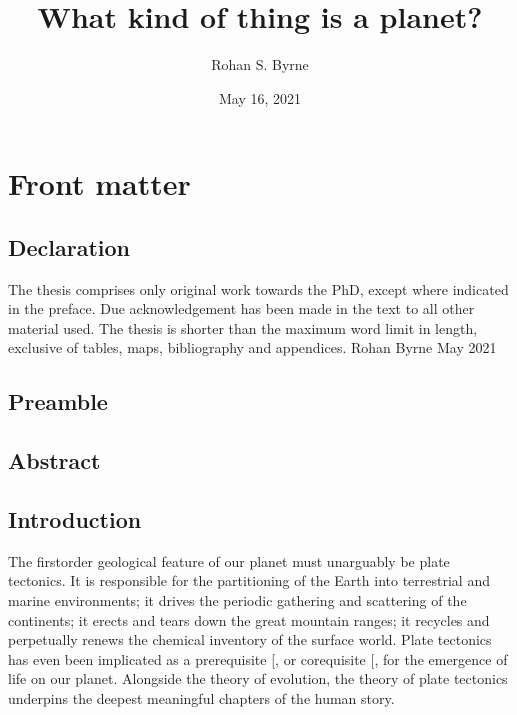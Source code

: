 \documentclass[letterpaper,10pt,english]{jupyterBook}
\title{What kind of thing is a planet?}
\date{May 16, 2021}
\author{Rohan S.\@{} Byrne}
\begin{document}
\pagestyle{empty}
\sphinxmaketitle
\pagestyle{plain}
\sphinxtableofcontents
\pagestyle{normal}
\label{\detokenize{index::doc}}



\part{Front matter}


\chapter{Declaration}
\label{\detokenize{frontmatter/declaration:declaration}}\label{\detokenize{frontmatter/declaration::doc}}
\sphinxAtStartPar
The thesis comprises only original work towards the PhD, except where indicated in the preface. Due acknowledgement has been made in the text to all other material used. The thesis is shorter than the maximum word limit in length, exclusive of tables, maps, bibliography and appendices.
Rohan Byrne
May 2021


\chapter{Preamble}
\label{\detokenize{frontmatter/preamble:preamble}}\label{\detokenize{frontmatter/preamble::doc}}

\chapter{Abstract}
\label{\detokenize{frontmatter/abstract:abstract}}\label{\detokenize{frontmatter/abstract::doc}}

\chapter{Introduction}
\label{\detokenize{frontmatter/introduction:introduction}}\label{\detokenize{frontmatter/introduction::doc}}
\sphinxAtStartPar
The first\sphinxhyphen{}order geological feature of our planet must unarguably be plate tectonics. It is responsible for the partitioning of the Earth into terrestrial and marine environments; it drives the periodic gathering and scattering of the continents; it erects and tears down the great mountain ranges; it recycles and perpetually renews the chemical inventory of the surface world. Plate tectonics has even been implicated as a prerequisite {[}, \sphinxcite{references:id417}{]} or co\sphinxhyphen{}requisite {[}, \sphinxcite{references:id435}{]} for the emergence of life on our planet. Alongside the theory of evolution, the theory of plate tectonics underpins the deepest meaningful chapters of the human story.
\end{document}
